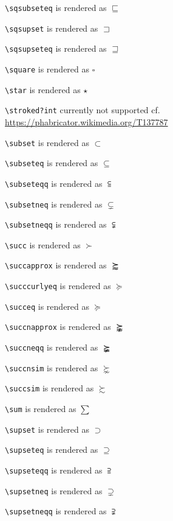 \texttt{\textbackslash sqsubseteq} is rendered as $\sqsubseteq$

\texttt{\textbackslash sqsupset} is rendered as $\sqsupset$

\texttt{\textbackslash sqsupseteq} is rendered as $\sqsupseteq$

\texttt{\textbackslash square} is rendered as $\square$

\texttt{\textbackslash star} is rendered as $\star$

\texttt{\textbackslash stroked?int} currently not supported cf. \newline \url{https://phabricator.wikimedia.org/T137787}

\texttt{\textbackslash subset} is rendered as $\subset$

\texttt{\textbackslash subseteq} is rendered as $\subseteq$

\texttt{\textbackslash subseteqq} is rendered as $\subseteqq$

\texttt{\textbackslash subsetneq} is rendered as $\subsetneq$

\texttt{\textbackslash subsetneqq} is rendered as $\subsetneqq$

\texttt{\textbackslash succ} is rendered as $\succ$

\texttt{\textbackslash succapprox} is rendered as $\succapprox$

\texttt{\textbackslash succcurlyeq} is rendered as $\succcurlyeq$

\texttt{\textbackslash succeq} is rendered as $\succeq$

\texttt{\textbackslash succnapprox} is rendered as $\succnapprox$

\texttt{\textbackslash succneqq} is rendered as $\succneqq$

\texttt{\textbackslash succnsim} is rendered as $\succnsim$

\texttt{\textbackslash succsim} is rendered as $\succsim$

\texttt{\textbackslash sum} is rendered as $\sum$

\texttt{\textbackslash supset} is rendered as $\supset$

\texttt{\textbackslash supseteq} is rendered as $\supseteq$

\texttt{\textbackslash supseteqq} is rendered as $\supseteqq$

\texttt{\textbackslash supsetneq} is rendered as $\supsetneq$

\texttt{\textbackslash supsetneqq} is rendered as $\supsetneqq$

